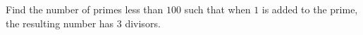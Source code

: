 Find the number of primes less than $100$ such that when $1$ is added to the prime, the resulting number has $3$ divisors.
